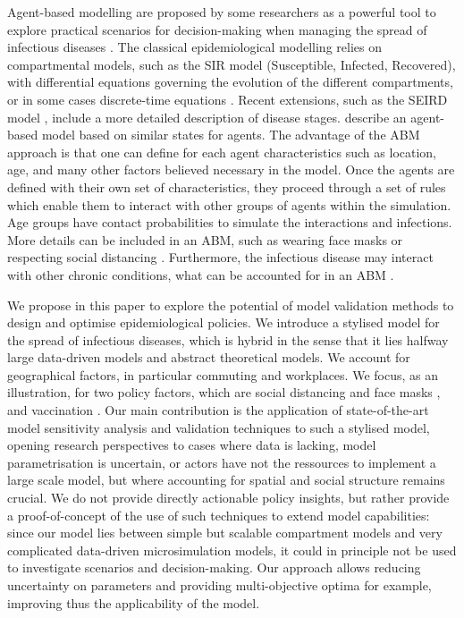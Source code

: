 \documentclass[smallextended]{svjour3}       %
\begin{document}
Agent-based modelling are proposed by some researchers as a powerful tool to explore practical scenarios for decision-making when managing the spread of infectious diseases \cite{miksch2019should}. The classical epidemiological modelling relies on compartmental models, such as the SIR model (Susceptible, Infected, Recovered), with differential equations governing the evolution of the different compartments, or in some cases discrete-time equations \cite{ramani2004oscillating}. Recent extensions, such as the SEIRD model \cite{chowell2008seasonal}, include a more detailed description of disease stages. \cite{chumachenko2018agent} describe an agent-based model based on similar states for agents. The advantage of the ABM approach is that one can define for each agent characteristics such as location, age, and many other factors believed necessary in the model. Once the agents are defined with their own set of characteristics, they proceed through a set of rules which enable them to interact with other groups of agents within the simulation. Age groups have contact probabilities to simulate the interactions and infections. More details can be included in an ABM, such as wearing face masks or respecting social distancing \cite{minoza2021covid}. Furthermore, the infectious disease may interact with other chronic conditions, what can be accounted for in an ABM \cite{fekadu2021impact}.


We propose in this paper to explore the potential of model validation methods to design and optimise epidemiological policies. We introduce a stylised model for the spread of infectious diseases, which is hybrid in the sense that it lies halfway large data-driven models and abstract theoretical models. We account for geographical factors, in particular commuting and workplaces. We focus, as an illustration, for two policy factors, which are social distancing and face masks \cite{kwon2021association}, and vaccination \cite{bicher2022model}. Our main contribution is the application of state-of-the-art model sensitivity analysis and validation techniques \cite{raimbault2019methods} to such a stylised model, opening research perspectives to cases where data is lacking, model parametrisation is uncertain, or actors have not the ressources to implement a large scale model, but where accounting for spatial and social structure remains crucial. We do not provide directly actionable policy insights, but rather provide a proof-of-concept of the use of such techniques to extend model capabilities: since our model lies between simple but scalable compartment models and very complicated data-driven microsimulation models, it could in principle not be used to investigate scenarios and decision-making. Our approach allows reducing uncertainty on parameters and providing multi-objective optima for example, improving thus the applicability of the model.
\end{document}
